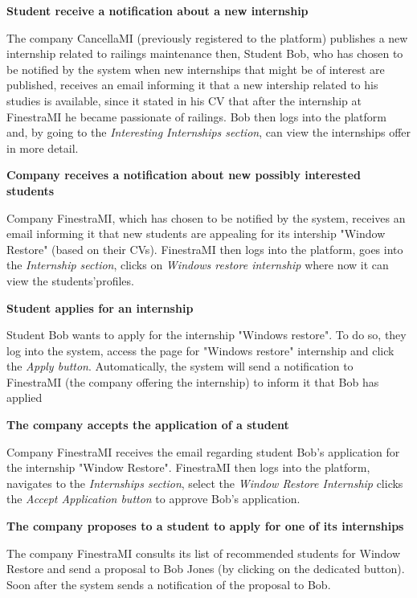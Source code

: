 		\textbf{Student receive a notification about a new internship}
		\begin{flushleft}
			The company CancellaMI (previously registered to the platform) publishes a new internship related to railings maintenance then, Student Bob, who has chosen to be notified by the system when new internships that might be of interest are published, receives an email informing it that a new intership related to his studies is available, since it stated in his CV that after the internship at FinestraMI he became passionate of railings. Bob then logs into the platform and, by going to the \emph{Interesting Internships section}, can view the internships offer in more detail.
		\end{flushleft}
		\textbf{Company receives a notification about new possibly interested students}
		\begin{flushleft}
			Company FinestraMI, which has chosen to be notified by the system, receives an email informing it that new students are appealing for its intership "Window Restore" (based on their CVs). FinestraMI then logs into the platform, goes into the \emph{Internship section}, clicks on \emph{Windows restore internship} where now it can view the students'profiles.
		\end{flushleft}
		\textbf{Student applies for an internship}
		\begin{flushleft}
			Student Bob wants to apply for the internship "Windows restore". To do so, they log into the system, access the page for "Windows restore" internship and click the \emph{Apply button}. Automatically, the system will send a notification to FinestraMI (the company offering the internship) to inform it that Bob has applied
		\end{flushleft}
		\textbf{The company accepts the application of a student}
		\begin{flushleft}
			Company FinestraMI receives the email regarding student Bob's application for the internship "Window Restore". FinestraMI then logs into the platform, navigates to the \emph{Internships section}, select the \emph{Window Restore Internship} clicks the \emph{Accept Application button} to approve Bob's application.
		\end{flushleft}
		\textbf{The company proposes to a student to apply for one of its internships}
		\begin{flushleft}
			The company FinestraMI consults its list of recommended students for Window Restore and send a proposal to Bob Jones (by clicking on the dedicated button). Soon after the system sends a notification of the proposal to Bob. 
		\end{flushleft}
